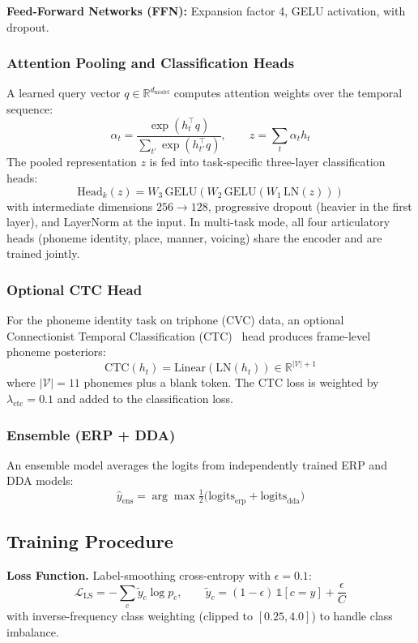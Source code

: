 \documentclass[11pt,a4paper]{article}
\begin{document}
\textbf{Feed-Forward Networks (FFN):} Expansion factor 4, GELU activation,
with dropout.

\subsubsection{Attention Pooling and Classification Heads}

A learned query vector $q \in \mathbb{R}^{d_{\text{model}}}$ computes attention
weights over the temporal sequence:
\[
  \alpha_t = \frac{\exp(h_t^\top q)}{\sum_{t'} \exp(h_{t'}^\top q)},
  \qquad
  z = \sum_t \alpha_t h_t
\]
The pooled representation $z$ is fed into task-specific three-layer
classification heads:
\[
  \text{Head}_k(z) = W_3\,\text{GELU}(W_2\,\text{GELU}(W_1\,\text{LN}(z)))
\]
with intermediate dimensions $256 \to 128$, progressive dropout (heavier in
the first layer), and LayerNorm at the input. In multi-task mode, all four
articulatory heads (phoneme identity, place, manner, voicing) share the encoder
and are trained jointly.

\subsubsection{Optional CTC Head}

For the phoneme identity task on triphone (CVC) data, an optional Connectionist
Temporal Classification (CTC)~\cite{graves2006} head produces frame-level
phoneme posteriors:
\[
  \text{CTC}(h_t) = \text{Linear}(\text{LN}(h_t)) \in \mathbb{R}^{|\mathcal{V}|+1}
\]
where $|\mathcal{V}| = 11$ phonemes plus a blank token. The CTC loss is
weighted by $\lambda_{\text{ctc}} = 0.1$ and added to the classification loss.

\subsubsection{Ensemble (ERP + DDA)}

An ensemble model averages the logits from independently trained ERP and DDA
models:
\[
  \hat{y}_{\text{ens}} = \arg\max \tfrac{1}{2}
  \bigl(\text{logits}_{\text{erp}} + \text{logits}_{\text{dda}}\bigr)
\]

\subsection{Training Procedure}

\textbf{Loss Function.} Label-smoothing cross-entropy with $\epsilon = 0.1$:
\[
  \mathcal{L}_{\text{LS}} = -\sum_c \tilde{y}_c \log p_c,
  \qquad
  \tilde{y}_c = (1-\epsilon)\,\mathbb{1}[c = y] + \frac{\epsilon}{C}
\]
with inverse-frequency class weighting (clipped to $[0.25, 4.0]$) to handle
class imbalance.
\end{document}
